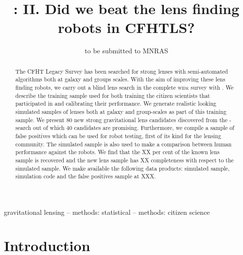 \documentclass[useAMS,usenatbib,a4paper]{mn2e}
\title[\sw II]
{\SW: II. Did we beat the lens finding robots in CFHTLS?}
\author[More et al.]{%
 
}
\begin{document}
             
\date{to be submitted to MNRAS}
\pagerange{\pageref{firstpage}--\pageref{lastpage}}

\maketitle           

\label{firstpage}


\begin{abstract} 

The CFHT Legacy Survey has been searched for strong lenses with
semi-automated algorithms both at galaxy and groups scales. With the aim
of improving these lens finding robots, we carry out a blind lens search
in the complete \cfhtls \textsc{wide} survey with \sw. We describe the training
sample used for both training the citizen scientists that participated
in \sw and calibrating their performance. We generate realistic looking
simulated samples of lenses both at galaxy and group-scales as part of
this training sample. We present 80 new strong gravitational lens
candidates discovered from the \sw-\cfhtls search out of which 40
candidates are promising. Furthermore, we compile a sample of false
positives which can be used for robot testing, first of its kind for the
lensing community. The simulated sample is also used to make a
comparison between human performance against the robots. We find that
the XX per cent of the known lens sample is recovered and the new lens
sample has XX completeness with respect to the simulated sample. We make
available the following data products: simulated sample, simulation code
and the false positives sample at XXX.

\end{abstract}


\begin{keywords}
  gravitational lensing   --
  methods: statistical    --
  methods: citizen science
\end{keywords}

\setcounter{footnote}{1}


\section{Introduction}
\label{sec:intro}
\end{document}
